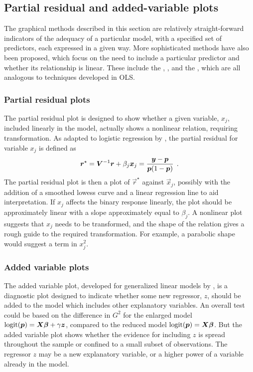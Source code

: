 \subsection{Partial residual and added-variable plots}\label{sec:logist-partial}
The graphical methods described in this section are relatively
straight-forward indicators of the adequacy of a particular model,
with a specified set of predictors, each expressed in a given way.
More sophisticated methods have also been proposed, which focus on the need to include a particular predictor and whether its relationship is linear.
These include the ,
, and the
,
which are all analogous to techniques developed in OLS.

\subsubsection{Partial residual plots}
The partial residual plot \citep{LarsenMcCleary:72} is designed to
show whether a given variable, $x_j$, included linearly in the model,
actually shows a nonlinear relation, requiring transformation.
As adapted to logistic regression by \citet{Landwehr-etal:84},
the partial residual for variable $x_j$ is defined as
\begin{equation*}%
\vec{r}^{\star} = \mat{V}^{-1} \vec{r} + \beta_j \vec{x}_j
 = \frac{\vec{y} - \vec{p}}{ \vec{p} (1 - \vec{p})} \period
\end{equation*}
The partial residual plot is then a plot of $\vec{r}^{\star}$ against
$\vec{x}_j$, possibly with the addition of a smoothed lowess curve
\citep{Fowlkes:87} and
a linear regression line to aid interpretation.
If $x_j$ affects the binary response linearly, the plot should be approximately linear with a slope approximately equal to $\beta_j$.
A nonlinear plot suggests that $x_j$ needs to be transformed, and
the shape of the relation gives a rough guide to the required
transformation.
For example, a parabolic shape would suggest a term in $x_j^2$.

\subsubsection{Added variable plots}
The added variable plot, developed for generalized linear models by
\citet{WangP:85}, is a diagnostic plot designed to indicate whether
some new regressor, $z$, should be added to the model
which includes other explanatory variables.
An overall test could be based on the difference in $G^2$ for
the enlarged model $\logit(\vec{p}) = \mat{X} \vec{\beta} + \gamma \vec{z}$,
compared to the reduced model
$\logit(\vec{p}) = \mat{X} \vec{\beta}$.
But the added variable plot shows whether the evidence for including
$z$ is spread throughout the sample or confined to a small subset
of observations.
The regressor $z$ may be a new explanatory variable, or a higher power
of a variable already in the model.

